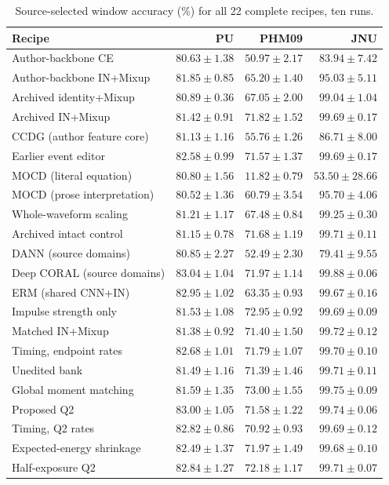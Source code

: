 \begin{table}[pos=htbp]
\centering\footnotesize
\caption{Source-selected window accuracy (\%) for all 22 complete recipes, ten runs.}
\label{tab:all-selected}
\begin{tabular}{lrrr}
\toprule
Recipe & PU & PHM09 & JNU\\
\midrule
Author-backbone CE & $80.63\pm1.38$ & $50.97\pm2.17$ & $83.94\pm7.42$\\
Author-backbone IN+Mixup & $81.85\pm0.85$ & $65.20\pm1.40$ & $95.03\pm5.11$\\
Archived identity+Mixup & $80.89\pm0.36$ & $67.05\pm2.00$ & $99.04\pm1.04$\\
Archived IN+Mixup & $81.42\pm0.91$ & $71.82\pm1.52$ & $99.69\pm0.17$\\
CCDG (author feature core) & $81.13\pm1.16$ & $55.76\pm1.26$ & $86.71\pm8.00$\\
Earlier event editor & $82.58\pm0.99$ & $71.57\pm1.37$ & $99.69\pm0.17$\\
MOCD (literal equation) & $80.80\pm1.56$ & $11.82\pm0.79$ & $53.50\pm28.66$\\
MOCD (prose interpretation) & $80.52\pm1.36$ & $60.79\pm3.54$ & $95.70\pm4.06$\\
Whole-waveform scaling & $81.21\pm1.17$ & $67.48\pm0.84$ & $99.25\pm0.30$\\
Archived intact control & $81.15\pm0.78$ & $71.68\pm1.19$ & $99.71\pm0.11$\\
DANN (source domains) & $80.85\pm2.27$ & $52.49\pm2.30$ & $79.41\pm9.55$\\
Deep CORAL (source domains) & $83.04\pm1.04$ & $71.97\pm1.14$ & $99.88\pm0.06$\\
ERM (shared CNN+IN) & $82.95\pm1.02$ & $63.35\pm0.93$ & $99.67\pm0.16$\\
Impulse strength only & $81.53\pm1.08$ & $72.95\pm0.92$ & $99.69\pm0.09$\\
Matched IN+Mixup & $81.38\pm0.92$ & $71.40\pm1.50$ & $99.72\pm0.12$\\
Timing, endpoint rates & $82.68\pm1.01$ & $71.79\pm1.07$ & $99.70\pm0.10$\\
Unedited bank & $81.49\pm1.16$ & $71.39\pm1.46$ & $99.71\pm0.11$\\
Global moment matching & $81.59\pm1.35$ & $73.00\pm1.55$ & $99.75\pm0.09$\\
Proposed Q2 & $83.00\pm1.05$ & $71.58\pm1.22$ & $99.74\pm0.06$\\
Timing, Q2 rates & $82.82\pm0.86$ & $70.92\pm0.93$ & $99.69\pm0.12$\\
Expected-energy shrinkage & $82.49\pm1.37$ & $71.97\pm1.49$ & $99.68\pm0.10$\\
Half-exposure Q2 & $82.84\pm1.27$ & $72.18\pm1.17$ & $99.71\pm0.07$\\
\bottomrule
\end{tabular}
\end{table}
